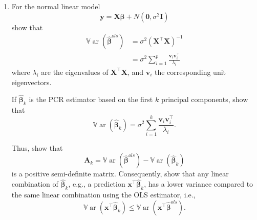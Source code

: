 \documentclass[
]{book}
\theoremstyle{definition}
\theoremstyle{definition}
\theoremstyle{definition}
\theoremstyle{definition}
\theoremstyle{remark}
\begin{document}
\begin{enumerate}
\def\labelenumi{\arabic{enumi}.}
\setcounter{enumi}{2}
\item
  For the normal linear model
  \[\mathbf y= \mathbf X\boldsymbol \beta+ N(\boldsymbol 0, \sigma^2 \mathbf I)\]
  show that
  \begin{align}
  {\mathbb{V}\operatorname{ar}}(\hat{\boldsymbol \beta}^{ols}) &= \sigma^2 (\mathbf X^\top \mathbf X)^{-1}\\
  &= \sigma^2\sum_{i=1}^p \frac{\mathbf v_i \mathbf v_i^\top}{\lambda_i}
  \end{align}
  where \(\lambda_i\) are the eigenvalues of \(\mathbf X^\top \mathbf X\), and \(\mathbf v_i\) the corresponding unit eigenvectors.

  If \(\hat{\boldsymbol \beta}_k\) is the PCR estimator based on the first \(k\) principal components, show that
  \[{\mathbb{V}\operatorname{ar}}(\hat{\boldsymbol \beta}_k) = \sigma^2 \sum_{i=1}^k \frac{\mathbf v_i \mathbf v_i^\top}{\lambda_i}.\]

  Thus, show that \[\mathbf A_k = {\mathbb{V}\operatorname{ar}}(\hat{\boldsymbol \beta}^{ols})-{\mathbb{V}\operatorname{ar}}(\hat{\boldsymbol \beta}_k)\] is a positive semi-definite matrix. Consequently, show that any linear combination of \(\hat{\boldsymbol \beta}_k\), e.g., a prediction \(\mathbf x^\top \hat{\boldsymbol \beta}_k\), has a lower variance compared to the same linear combination using the OLS estimator, i.e.,
  \[{\mathbb{V}\operatorname{ar}}(\mathbf x^\top \hat{\boldsymbol \beta}_k)\leq {\mathbb{V}\operatorname{ar}}(\mathbf x^\top \hat{\boldsymbol \beta}^{ols}).\]
\end{enumerate}

  
\end{document}
